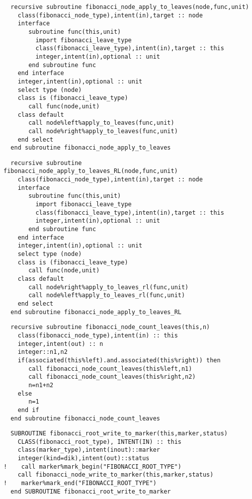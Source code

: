 \begin{Verbatim}
  recursive subroutine fibonacci_node_apply_to_leaves(node,func,unit)
    class(fibonacci_node_type),intent(in),target :: node
    interface
       subroutine func(this,unit)
         import fibonacci_leave_type
         class(fibonacci_leave_type),intent(in),target :: this
         integer,intent(in),optional :: unit
       end subroutine func
    end interface
    integer,intent(in),optional :: unit
    select type (node)
    class is (fibonacci_leave_type)
       call func(node,unit)
    class default 
       call node%left%apply_to_leaves(func,unit)
       call node%right%apply_to_leaves(func,unit)
    end select
  end subroutine fibonacci_node_apply_to_leaves
\end{Verbatim}

\begin{Verbatim}
  recursive subroutine fibonacci_node_apply_to_leaves_RL(node,func,unit)
    class(fibonacci_node_type),intent(in),target :: node
    interface
       subroutine func(this,unit)
         import fibonacci_leave_type
         class(fibonacci_leave_type),intent(in),target :: this
         integer,intent(in),optional :: unit
       end subroutine func
    end interface
    integer,intent(in),optional :: unit
    select type (node)
    class is (fibonacci_leave_type)
       call func(node,unit)
    class default 
       call node%right%apply_to_leaves_rl(func,unit)
       call node%left%apply_to_leaves_rl(func,unit)
    end select
  end subroutine fibonacci_node_apply_to_leaves_RL
\end{Verbatim}
  
\begin{Verbatim}
  recursive subroutine fibonacci_node_count_leaves(this,n)
    class(fibonacci_node_type),intent(in) :: this
    integer,intent(out) :: n
    integer::n1,n2
    if(associated(this%left).and.associated(this%right)) then
       call fibonacci_node_count_leaves(this%left,n1)
       call fibonacci_node_count_leaves(this%right,n2)
       n=n1+n2
    else
       n=1
    end if
  end subroutine fibonacci_node_count_leaves
\end{Verbatim}

\begin{Verbatim}
  SUBROUTINE fibonacci_root_write_to_marker(this,marker,status)
    CLASS(fibonacci_root_type), INTENT(IN) :: this
    class(marker_type),intent(inout)::marker
    integer(kind=dik),intent(out)::status
!    call marker%mark_begin("FIBONACCI_ROOT_TYPE")
    call fibonacci_node_write_to_marker(this,marker,status)
!    marker%mark_end("FIBONACCI_ROOT_TYPE")
  end SUBROUTINE fibonacci_root_write_to_marker
\end{Verbatim}

